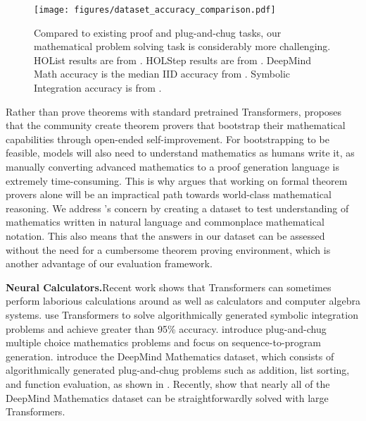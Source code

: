 \documentclass{article}
\begin{document}
\begin{wrapfigure}{r}{0.5\textwidth}
    \vspace{-10pt}
    \centering
    \texttt{[image: figures/dataset\_accuracy\_comparison.pdf]}
    \caption{Compared to existing proof and plug-and-chug tasks, our mathematical problem solving task is considerably more challenging. HOList results are from \citet{Wu2021LIMELI}. HOLStep results are from \citet{Crouse2019ImprovingGN}. DeepMind Math accuracy is the median IID accuracy from \citet{Henighan2020ScalingLF}. Symbolic Integration accuracy is from \citet{Lample2020DeepLF}.}
    \label{fig:datasetsacc}
    \vspace{-10pt}
\end{wrapfigure}

Rather than prove theorems with standard pretrained Transformers, \citet{McAllester2020MathZeroTC} proposes that the community create theorem provers that bootstrap their mathematical capabilities through open-ended self-improvement. For bootstrapping to be feasible, models will also need to understand mathematics as humans write it, as manually converting advanced mathematics to a proof generation language is extremely time-consuming. This is why \citet{Szegedy2020APP} argues that working on formal theorem provers alone will be an impractical path towards world-class mathematical reasoning. We address \citet{Szegedy2020APP}'s concern by creating a dataset to test understanding of mathematics written in natural language and commonplace mathematical notation. 
This also means that the answers in our dataset can be assessed without the need for a cumbersome theorem proving environment, which is another advantage of our evaluation framework.





\textbf{Neural Calculators.}\quad Recent work shows that Transformers can sometimes perform laborious calculations around as well as calculators and computer algebra systems. \citet{Lample2020DeepLF} use Transformers to solve algorithmically generated symbolic integration problems and achieve greater than 95\% accuracy. \citet{Amini2019MathQATI,Ling2017ProgramIB} introduce plug-and-chug multiple choice mathematics problems and focus on sequence-to-program generation.
\citet{Saxton2019AnalysingMR} introduce the DeepMind Mathematics dataset, which consists of algorithmically generated plug-and-chug problems such as addition, list sorting, and function evaluation, as shown in . Recently, \citet{Henighan2020ScalingLF} show that nearly all of the DeepMind Mathematics dataset can be straightforwardly solved with large Transformers.
\end{document}
